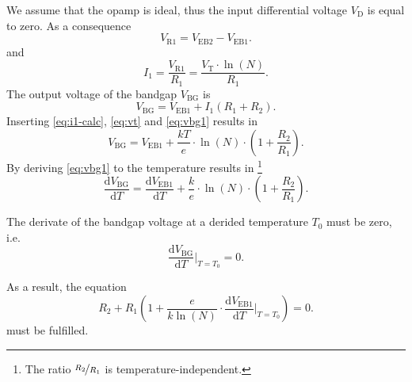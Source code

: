 \documentclass{article}[11pt]
\begin{document}
We assume that the opamp is ideal, thus the input differential voltage
$V_{\mathrm{D}}$  is equal to zero.
As a consequence
\begin{equation}
V_{\mathrm{R1}} = V_\mathrm{EB2}-V_\mathrm{EB1}.
\end{equation}
and
\begin{equation}\label{eq:i1-calc}
I_1 = \frac{V_{\mathrm{R1}}}{R_1} = \frac{V_\mathrm{T} \cdot \ln(N)}{R_1}.
\end{equation}
The output voltage of the bandgap $V_{\mathrm{BG}}$ is
\begin{equation}\label{eq:vbg1}
V_{\mathrm{BG}} = V_{\mathrm{EB1}} + I_1 \left(R_1+R_2\right).
\end{equation}
Inserting \eqref{eq:i1-calc}, \eqref{eq:vt} and \eqref{eq:vbg1} results in
\begin{equation}\label{eq:vbg1}
V_{\mathrm{BG}} = V_{\mathrm{EB1}} + 
                \frac{kT}{e} \cdot \ln(N) \cdot \left(1+\frac{R_2}{R_1}\right).
\end{equation}
By deriving \eqref{eq:vbg1} to the temperature results in
\footnote{The ratio $\nicefrac{R_2}{R_1}$ is temperature-independent.}
\begin{equation}
\frac{\mathrm{d}V_{\mathrm{BG}}}{\mathrm{d}T}
= \frac{\mathrm{d}V_{\mathrm{EB1}}}{\mathrm{d}T}
+ \frac{k}{e} \cdot \ln(N) \cdot \left(1+\frac{R_2}{R_1}\right).
\end{equation}

The derivate of the bandgap voltage at a derided temperature $T_0$
must be zero, i.e.
\begin{equation}
\frac{\mathrm{d}V_{\mathrm{BG}}}{\mathrm{d}T}\bigg|_{T=T_0} = 0.
\end{equation}

As a result, the equation 
\begin{equation}
R_2 + R_1\left(1+\frac{e}{k \ln(N)} \cdot \frac{\mathrm{d}V_{\mathrm{EB1}}}{\mathrm{d}T}\bigg|_{T=T_0}\right) = 0.
\end{equation}
must be fulfilled.

\printbibliography
\end{document}
